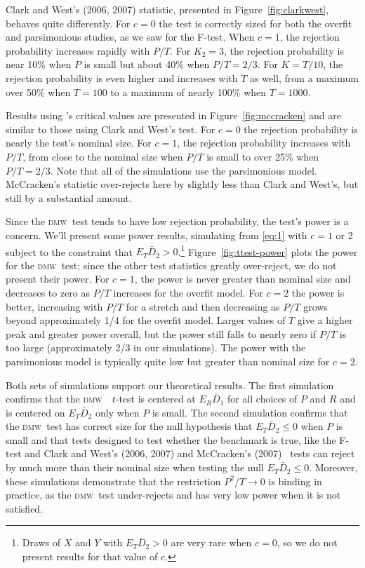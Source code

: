 \documentclass[11pt]{article}
\newcommand{\citepos}[1]{\citeauthor{#1}'s \citeyearpar{#1}}
\newcommand{\dmw}{\textsc{dmw}}
\begin{document}
Clark and West's (2006, 2007) statistic, presented in
Figure~\ref{fig:clarkwest}, behaves quite differently.  For $c=0$ the
test is correctly sized for both the overfit and parsimonious studies,
as we saw for the F-test.  When $c=1$, the rejection probability
increases rapidly with $P/T$.  For $K_2=3$, the rejection probability
is near 10\% when $P$ is small but about 40\% when $P/T = 2/3$.  For
$K=T/10$, the rejection probability is even higher and increases with
$T$ as well, from a maximum over 50\% when $T=100$ to a maximum of
nearly 100\% when $T=1000$.

Results using \citepos{Mcc:07} critical values are
presented in Figure~\ref{fig:mccracken} and are similar to those using
Clark and West's test.  For $c=0$ the rejection probability is nearly
the test's nominal size.  For $c=1$, the rejection probability
increases with $P/T$, from close to the nominal size when $P/T$ is
small to over 25\% when $P/T = 2/3$.  Note that all of the simulations
use the parsimonious model.  McCracken's statistic over-rejects here
by slightly less than Clark and West's, but still by a substantial
amount.

Since the \dmw\ test tends to have low rejection probability, the
test's power is a concern.  We'll present some power results,
simulating from \eqref{eq:1} with $c = 1$ or 2 subject to the
constraint that $E_T \bar D_2 > 0$.\footnote{Draws of $X$ and $Y$ with
  $E_T \bar D_2 > 0$ are very rare when $c=0$, so we do not present
  results for that value of $c$.}  Figure~\ref{fig:ttest-power} plots
the power for the \dmw\ test; since the other test statistics greatly
over-reject, we do not present their power.  For $c=1$, the power is
never greater than nominal size and decreases to zero as $P/T$
increases for the overfit model.  For $c=2$ the power is better,
increasing with $P/T$ for a stretch and then decreasing as $P/T$ grows
beyond approximately 1/4 for the overfit model.  Larger values of $T$
give a higher peak and greater power overall, but the power still
falls to nearly zero if $P/T$ is too large (approximately 2/3 in our
simulations).  The power with the parsimonious model is typically
quite low but greater than nominal size for $c = 2$.

Both sets of simulations support our theoretical results.  The first
simulation confirms that the \dmw\ \oos\ $t$-test is centered at $E_R
\bar D_1$ for all choices of $P$ and $R$ and is centered on $E_T \bar
D_2$ only when $P$ is small.  The second simulation confirms that the
\dmw\ test has correct size for the null hypothesis that $E_T \bar D_2
\leq 0$ when $P$ is small and that tests designed to test whether the
benchmark is true, like the F-test and Clark and West's (2006, 2007)
and McCracken's (2007) \oos\ tests can reject by much more than their
nominal size when testing the null $E_T \bar D_2 \leq 0$.
Moreover, these simulations demonstrate that the restriction $P^2/T
\to 0$ is binding in practice, as the \dmw\ test under-rejects and has
very low power when it is not satisfied.
\end{document}
